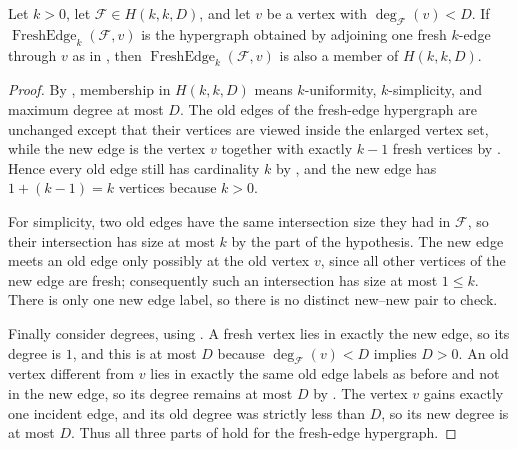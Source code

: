 \begin{helper}
Let $k>0$, let $\mathcal F\in H(k,k,D)$, and let $v$ be a vertex with
$\deg_{\mathcal F}(v)<D$.  If
$\operatorname{FreshEdge}_k(\mathcal F,v)$ is the hypergraph obtained by
adjoining one fresh $k$-edge through $v$ as in
, then
$\operatorname{FreshEdge}_k(\mathcal F,v)$ is also a member of $H(k,k,D)$.
\end{helper}
\begin{proof}
By , membership in $H(k,k,D)$ means
$k$-uniformity, $k$-simplicity, and maximum degree at most $D$.
The old edges of the fresh-edge hypergraph are unchanged except that their
vertices are viewed inside the enlarged vertex set, while the new edge is
the vertex $v$ together with exactly $k-1$ fresh vertices by
.  Hence every old edge still has
cardinality $k$ by , and the new edge has
$1+(k-1)=k$ vertices because $k>0$.

For simplicity, two old edges have the same intersection size they had in
$\mathcal F$, so their intersection has size at most $k$ by the
 part of the hypothesis.  The new edge meets an
old edge only possibly at the old vertex $v$, since all other vertices of
the new edge are fresh; consequently such an intersection has size at most
$1\le k$.  There is only one new edge label, so there is no distinct
new--new pair to check.

Finally consider degrees, using .  A fresh vertex
lies in exactly the new edge, so its degree is $1$, and this is at most $D$
because $\deg_{\mathcal F}(v)<D$ implies $D>0$.  An old vertex different
from $v$ lies in exactly the same old edge labels as before and not in the
new edge, so its degree remains at most $D$ by .
The vertex $v$ gains exactly one incident edge, and its old degree was
strictly less than $D$, so its new degree is at most $D$.  Thus all three
parts of  hold for the fresh-edge hypergraph.
\end{proof}
